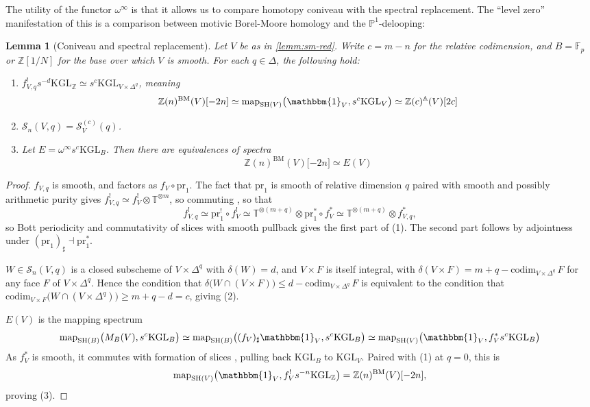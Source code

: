 \documentclass[11pt, twoside]{article}
\numberwithin{equation}{section}
\newtheorem{lemma}[equation]{Lemma}
\theoremstyle{definition}
\newcommand{\bb}[1]{\mathbb{#1}}
\newcommand{\codim}{\mathrm{codim}}
\newcommand{\pr}{\mathrm{pr}}
\newcommand{\map}{\mathrm{map}}
\newcommand{\Kgl}{\mathrm{KGL}}
\newcommand{\sh}{\mathrm{SH}}
\newcommand{\bm}{\mathrm{BM}}
\begin{document}
The utility of the functor \(\omega^\infty\) is that it allows us to compare homotopy coniveau with the spectral replacement. The ``level zero'' manifestation of this is a comparison between motivic Borel-Moore homology and the \(\bb{P}^1\)-delooping:

\begin{lemma}[Coniveau and spectral replacement]\label{lemm:LvT}
Let \(V\) be as in \ref{lemm:sm-red}. Write \(c = m - n\) for the relative codimension, and \(B = \bb{F}_p\) or \(\bb{Z}[1/N]\) for the base over which \(V\) is smooth. For each \(q \in \Delta\), the following hold:
\begin{enumerate}

\item \(f_{V, q}^! s^{- d} \Kgl_\bb{Z} \simeq s^c \Kgl_{V \times \Delta^q}\), meaning 
\[\bb{Z}(n)^\bm(V) \lbrack -2n \rbrack \simeq \map_{\sh(V)}\big(\mathbbm{1}_V, s^c \Kgl_V\big) \simeq \bb{Z}(c)^\bb{A}(V)[2c]\]

\item \(\mathcal{S}_n(V, q) = \mathcal{S}_V^{(c)}(q)\).

\item Let \(E = \omega^\infty s^c \Kgl_B\). Then there are equivalences of spectra 
\[\bb{Z}(n)^\bm(V) \lbrack -2n \rbrack \simeq E(V)\]

\end{enumerate}
\end{lemma}

\begin{proof}
\(f_{V, q}\) is smooth, and factors as \(f_V \circ \pr_1\). The fact that \(\pr_1\) is smooth of relative dimension \(q\) paired with smooth and possibly arithmetic purity gives \(f_{V, q}^! \simeq f_V^! \otimes \bb{T}^{\otimes m}\), so commuting , so that 
\[f_{V, q}^! \simeq \pr_1^! \circ f_V^! \simeq \bb{T}^{\otimes (m + q)} \otimes \pr_1^* \circ f_V^* \simeq \bb{T}^{\otimes (m + q)} \otimes f_{V, q}^*,\]
so Bott periodicity and commutativity of slices with smooth pullback gives the first part of (1). The second part follows by adjointness under \((\pr_1)_\sharp \dashv \pr_1^*\).

\(W \in \mathcal{S}_n(V, q)\) is a closed subscheme of \(V \times \Delta^q\) with \(\delta(W) = d\), and \(V \times F\) is itself integral, with \(\delta(V \times F) = m + q - \codim_{V \times \Delta^q} \, F\) for any face \(F\) of \(V \times \Delta^q\). Hence the condition that \(\delta\big(W \cap (V \times F)\big) \leq d - \codim_{V \times \Delta^q} \, F\) is equivalent to the condition that \(\codim_{V \times F}\big(W \cap (V \times \Delta^q)\big) \geq m + q - d = c\), giving (2).

\(E(V)\) is the mapping spectrum 
\[\map_{\sh(B)}\big(M_B(V), s^c \Kgl_B\big) \simeq \map_{\sh(B)}\big((f_V)_\sharp \mathbbm{1}_V, s^c \Kgl_B\big) \simeq \map_{\sh(V)}\big(\mathbbm{1}_V, f_V^* s^c \Kgl_B\big)
\]
As \(f_V^*\) is smooth, it commutes with formation of slices \cite[Remark 3.41]{BEM}, pulling back \(\Kgl_B\) to \(\Kgl_V\). Paired with (1) at \(q = 0\), this is 
\[\map_{\sh(V)}\big(\mathbbm{1}_V, f_V^! s^{- n} \Kgl_\bb{Z}\big) = \bb{Z}(n)^\bm(V) \lbrack -2n \rbrack,\]
proving (3).
\end{proof}
\end{document}
